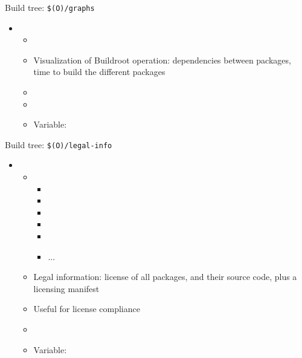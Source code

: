\begin{frame}{Build tree: {\tt \$(O)/graphs}}
  \begin{itemize}
  \item {}
    \begin{itemize}
    \item {}
    \item Visualization of Buildroot operation: dependencies between
      packages, time to build the different packages
    \item {}
    \item {}
    \item Variable: 
    \end{itemize}
  \end{itemize}
\end{frame}

\begin{frame}{Build tree: {\tt \$(O)/legal-info}}
  \begin{itemize}
  \item {}
    \begin{itemize}
    \item {}
      \begin{itemize}
        \scriptsize
      \item {}
      \item {}
      \item {}
      \item {}
      \item {}
      \item ...
      \end{itemize}
    \item Legal information: license of all packages, and their
      source code, plus a licensing manifest
    \item Useful for license compliance
    \item {}
    \item Variable: 
    \end{itemize}
  \end{itemize}
\end{frame}
